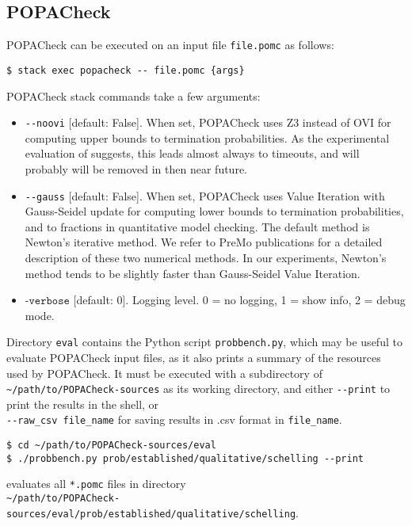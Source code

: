 \documentclass[9pt,a4paper]{article}
\begin{document}
\subsection{POPACheck}

POPACheck can be executed on an input file \verb|file.pomc| as follows:
\begin{verbatim}
$ stack exec popacheck -- file.pomc {args}
\end{verbatim}

POPACheck stack commands take a few arguments:
\begin{itemize}
    \item \verb|--noovi| [default: False]. When set, POPACheck uses Z3 instead of OVI for computing upper bounds to termination probabilities. As the experimental evaluation of \cite{POPACheck} suggests, this leads almost always to timeouts, and will probably will be removed in then near future.
    \item \verb|--gauss| [default: False]. When set, POPACheck uses Value Iteration with Gauss-Seidel update for computing lower bounds to termination probabilities, and to fractions in quantitative model checking. The default method is Newton's iterative method. We refer to PreMo publications \cite{WojtczakE07,Wojtczak09} for a detailed description of these two numerical methods. In our experiments, Newton's method tends to be slightly faster than Gauss-Seidel Value Iteration.
    \item $\texttt{-verbose}$ [default: 0]. Logging level. 0 = no logging, 1 = show info, 2 = debug mode.
\end{itemize}

Directory \verb|eval| contains the Python script \verb|probbench.py|,
which may be useful to evaluate POPACheck input files, as it also prints
a summary of the resources used by POPACheck.
It must be executed with a subdirectory of \verb|~/path/to/POPACheck-sources| as its working directory, and either \verb|--print| to print the results in the shell, or \\ \verb|--raw_csv file_name| for saving results in .csv format in \verb|file_name|.

\begin{verbatim}
$ cd ~/path/to/POPACheck-sources/eval
$ ./probbench.py prob/established/qualitative/schelling --print
\end{verbatim}
evaluates all \verb|*.pomc| files in directory \\ \verb|~/path/to/POPACheck-sources/eval/prob/established/qualitative/schelling|.
\end{document}
